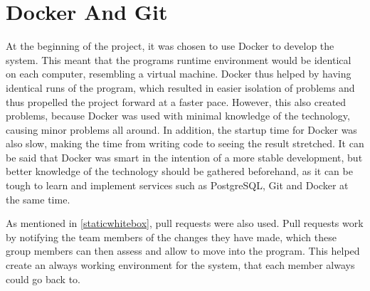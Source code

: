 \section{Docker And Git}
At the beginning of the project, it was chosen to use Docker to develop the system.
This meant that the programs runtime environment would be identical on each computer, resembling a virtual machine.
Docker thus helped by having identical runs of the program, which resulted in easier isolation of problems and thus propelled the project forward at a faster pace.
However, this also created problems, because Docker was used with minimal knowledge of the technology, causing minor problems all around.
In addition, the startup time for Docker was also slow, making the time from writing code to seeing the result stretched.
It can be said that Docker was smart in the intention of a more stable development, but better knowledge of the technology should be gathered beforehand, as it can be tough to learn and implement services such as PostgreSQL, Git and Docker at the same time.

As mentioned in \cref{staticwhitebox}, pull requests were also used.
Pull requests work by notifying the team members of the changes they have made, which these group members can then assess and allow to move into the program.
This helped create an always working environment for the system, that each member always could go back to.
